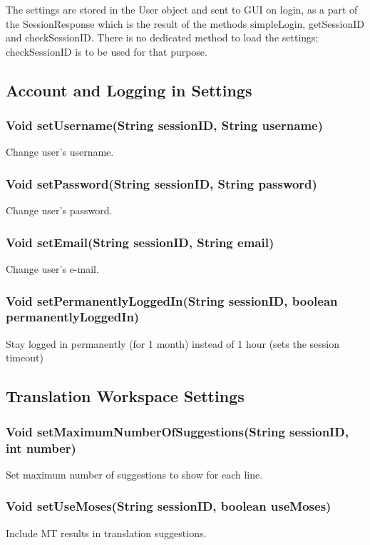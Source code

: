 The settings are stored in the User object and sent to GUI on login, as a part of the SessionResponse which is the result of the methods simpleLogin, getSessionID and checkSessionID. There is no dedicated method to load the settings; checkSessionID is to be used for that purpose.

\subsection{Account and Logging in Settings}

\subsubsection{Void setUsername(String sessionID, String username)}
Change user's username.

\subsubsection{Void setPassword(String sessionID, String password)}
Change user's password.

\subsubsection{Void setEmail(String sessionID, String email)}
Change user's e-mail.

\subsubsection{Void setPermanentlyLoggedIn(String sessionID, boolean permanentlyLoggedIn)}
Stay logged in permanently (for 1 month) instead of 1 hour (sets the session timeout)

\subsection{Translation Workspace Settings}

\subsubsection{Void setMaximumNumberOfSuggestions(String sessionID, int number)}
Set maximum number of suggestions to show for each line.

\subsubsection{Void setUseMoses(String sessionID, boolean useMoses)}
Include MT results in translation suggestions.

